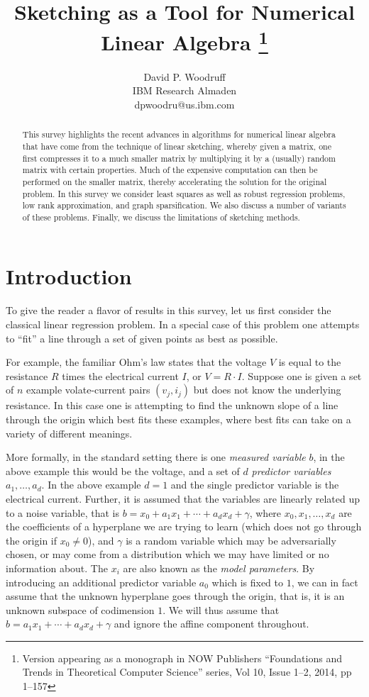 \documentclass[11pt]{article}
\title{Sketching as a Tool for Numerical Linear Algebra
\footnote{Version appearing as a monograph in NOW Publishers
``Foundations and Trends in Theoretical Computer Science'' series,
Vol 10, Issue 1--2, 2014, pp 1--157}}
\author{David P. Woodruff\\
IBM Research Almaden\\
dpwoodru@us.ibm.com
}
\begin{document}
\maketitle


\begin{abstract}
This survey highlights the recent advances in algorithms for
numerical linear algebra that have come from the technique of
linear sketching, whereby given a matrix, one first compresses it to
a much smaller matrix by multiplying it by a (usually) random 
matrix with certain
properties. Much of the expensive computation can then be performed on
the smaller matrix, thereby accelerating the solution for the original
problem. 
In this survey we consider least squares as well as robust regression problems,
low rank approximation, and graph sparsification. We also discuss a number
of variants of these problems. Finally, we discuss the limitations of 
sketching methods.
\end{abstract}
\newpage
\tableofcontents
\newpage
\section{Introduction}
To give the reader a flavor of results in this survey, let us
first consider the classical linear regression problem.
In a special case of this problem one attempts to ``fit'' a line through a set
of given points as best as possible. 

For example, the familiar
Ohm's law states that the voltage $V$ is equal to the resistance
$R$ times the electrical current $I$, or $V = R \cdot I$. Suppose one is
given a set of $n$ example volate-current pairs $(v_j, i_j)$
but does not know the underlying resistance. In this case one is
attempting to find the unknown slope of a line through the origin
which best fits these examples, where best fits can take on a
variety of different meanings. 

More formally, in the standard setting there is one {\it measured variable}
$b$, in the above example this would be the voltage, and a set of
$d$ {\it predictor variables} $a_1, \ldots, a_d$. In the above example $d = 1$
and the single predictor variable is the electrical current. 
Further, it is assumed
that the variables are linearly related up to a noise variable, that is
$b = x_0 + a_1 x_1 + \cdots + a_d x_d + \gamma$, where $x_0, x_1, \ldots, x_d$
are the coefficients of a hyperplane we are trying to learn 
(which does not go through the origin
if $x_0 \neq 0$), and $\gamma$ is a random variable which may be adversarially
chosen, or may come from a distribution which we may have limited or no 
information about. The $x_i$ are also known as the {\it model parameters}. By
introducing an additional predictor variable $a_0$ which is fixed to $1$, 
we can in fact assume that the unknown hyperplane goes through the origin,
that is, it is an unknown subspace of codimension $1$. We will thus assume
that $b = a_1 x_1 + \cdots + a_d x_d + \gamma$ and ignore the affine component
throughout.
\end{document}
